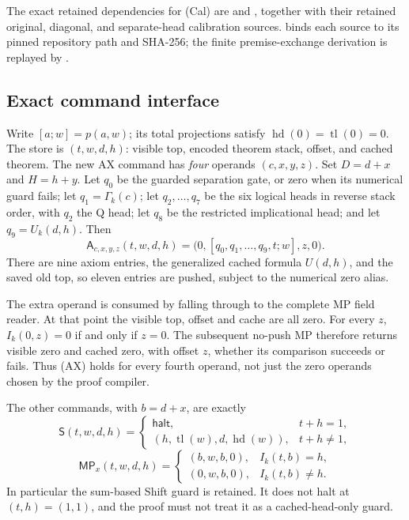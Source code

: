 The exact retained dependencies for (Cal) are
 and
, together with their
retained original, diagonal, and separate-head calibration sources.
 binds each source to its pinned repository
path and SHA-256; the finite premise-exchange derivation is replayed by
.

\subsection{Exact command interface}

Write $[a;w]=p(a,w)$; its total projections satisfy
$\operatorname{hd}(0)=\operatorname{tl}(0)=0$.  The store is $(t,w,d,h)$:
visible top, encoded theorem stack, offset, and cached theorem.  The new AX
command has \emph{four} operands $(c,x,y,z)$.  Set $D=d+x$ and $H=h+y$.
Let $q_0$ be the guarded separation gate, or zero when its numerical guard
fails; let $q_1=\Gamma_k(c)$; let $q_2,\ldots,q_7$ be the six logical
heads in reverse stack order, with $q_2$ the Q head; let $q_8$ be the
restricted implicational head; and let $q_9=U_k(d,h)$.  Then
\[
 \mathsf A_{c,x,y,z}(t,w,d,h)
 =\bigl(0,[q_0,q_1,\ldots,q_9,t;w],z,0\bigr).       \tag{AX}
\]
There are nine axiom entries, the generalized cached formula $U(d,h)$,
and the saved old top, so eleven
entries are pushed, subject to the numerical zero alias.

The extra operand is consumed by falling through to the complete MP field
reader.  At that point the visible top, offset and cache are all zero.
For every $z$, $I_k(0,z)=0$ if and only if $z=0$.  The subsequent no-push MP
therefore returns visible zero and cached zero, with offset $z$, whether
its comparison succeeds or fails.  Thus (AX) holds for every fourth
operand, not just the zero operands chosen by the proof compiler.

The other commands, with $b=d+x$, are exactly
\[
 \mathsf S(t,w,d,h)=
 \begin{cases}
  \mathsf{halt},&t+h=1,\\
  (h,\operatorname{tl}(w),d,\operatorname{hd}(w)),&t+h\ne1,
 \end{cases}
\]
\[
 \mathsf{MP}_x(t,w,d,h)=
 \begin{cases}
  (b,w,b,0),&I_k(t,b)=h,\\
  (0,w,b,0),&I_k(t,b)\ne h.
 \end{cases}                                                \tag{MP}
\]
In particular the sum-based Shift guard is retained.  It does not halt at
$(t,h)=(1,1)$, and the proof must not treat it as a cached-head-only guard.

